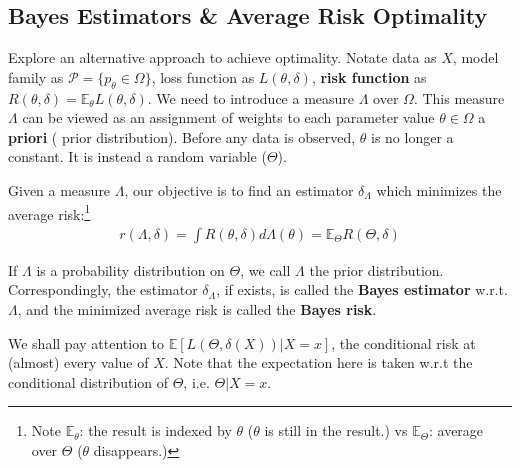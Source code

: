 \subsection{Bayes Estimators \& Average Risk Optimality}

Explore an alternative approach to achieve optimality.
Notate data as $X$, 
model family as $\mathcal{P}=\{p_\theta\in\Omega\}$,
loss function as $L(\theta,\delta)$, 
\textbf{risk function} as $R(\theta,\delta)=\mathbb{E}_\theta{L(\theta,\delta)}$.
We need to introduce a measure $\Lambda$ over $\Omega$.
This measure $\Lambda$ can be viewed as an assignment of weights 
to each parameter value $\theta\in\Omega$ a \textbf{priori} ( prior distribution).
Before any data is observed, $\theta$ is no longer a constant.
It is instead a random variable ($\Theta$).

Given a measure $\Lambda$, our objective is to find an estimator $\delta_\Lambda$
which minimizes the average risk:\footnote{
Note $\mathbb{E}_\theta$: the result is indexed by $\theta$
($\theta$ is still in the result.) vs
$\mathbb{E}_\Theta$: average over $\Theta$
($\theta$ disappears.)
}
\begin{gather}
    r(\Lambda,\delta)=\int{R(\theta,\delta)}d\Lambda(\theta)=\mathbb{E}_\Theta{R(\Theta,\delta)}
\end{gather}

If $\Lambda$ is a probability distribution on $\Theta$,
we call $\Lambda$ the prior distribution.
Correspondingly, the estimator $\delta_\Lambda$, if exists, 
is called the \textbf{Bayes estimator} w.r.t. $\Lambda$,
and the minimized average risk is called the \textbf{Bayes risk}.

We shall pay attention to $\mathbb{E}[L(\Theta,\delta(X))|X=x]$,
the conditional risk at (almost) every value of $X$.
Note that the expectation here is taken w.r.t the conditional distribution of $\Theta$,
i.e. $\Theta|X=x$.


